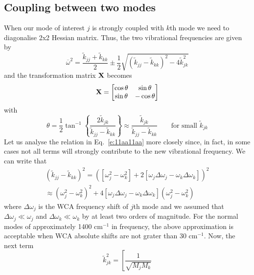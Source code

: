 \documentclass[a4paper,titlepage,twoside,fleqn,12pt]{book}
\begin{document}
\begin{refsection}
\subsection{Coupling between two modes\label{s:coupling-between-2-modes}}

When our mode of interest $j$ is strongly coupled
with $k$th mode we need to diagonalise 2x2 Hessian matrix.
Thus, the two vibrational frequencies are given by
%
\begin{equation} \label{e:11aa11aa}
 \overline{\omega}^2 = %
\frac{ \tilde{k}_{jj} + \tilde{k}_{kk} }{2}
\pm \frac{1}{2}
\sqrt{\left( \tilde{k}_{jj} - \tilde{k}_{kk}\right)^2 - 4\tilde{k}_{jk}^2}
\end{equation}
%
and the transformation matrix $\bf X$ becomes
%
\begin{equation} \label{e:ohoho}
 {\bf X} = 
\begin{bmatrix}
\cos{\theta} &   \sin{\theta}\\ 
\sin{\theta} &  -\cos{\theta}
\end{bmatrix}
\end{equation}
%
with
%
\begin{equation}
\theta = \frac{1}{2} \tan^{-1}\left\{\frac{2\tilde{k}_{jk}}{\tilde{k}_{jj} - \tilde{k}_{kk}}\right\} 
 \approx \frac{\tilde{k}_{jk}}{\tilde{k}_{jj} - \tilde{k}_{kk}} \qquad\text{for small $\tilde{k}_{jk}$}
\end{equation}
%
Let us analyse the relation in Eq.~\eqref{e:11aa11aa} more closely
since, in fact, in some cases not all terms will strongly contribute to the new vibrational
frequency. We can write that
%
\begin{multline}
 \left( \tilde{k}_{jj} - \tilde{k}_{kk}\right)^2 = 
 \left( \left[ \omega_j^2 - \omega_k^2 \right] 
 +
 2\left[ \omega_j\Delta\omega_j - \omega_k\Delta\omega_k \right]\right)^2 \\
 \approx \left( \omega_j^2 - \omega_k^2 \right)^2
 + 4 \left[ \omega_j\Delta\omega_j - \omega_k\Delta\omega_k \right] \left( \omega_j^2 - \omega_k^2 \right)
\end{multline}
%
where $\Delta\omega_j$ is the WCA frequency shift of $j$th mode
and we assumed that $\Delta\omega_j\ll\omega_j$ and $\Delta\omega_k\ll\omega_k$
by at least two orders of magnitude. For the
normal modes of approximately 1400 cm$^{-1}$
in frequency, the above approximation is acceptable
when WCA absolute shifts are not grater than 30 cm$^{-1}$.
Now, the next term
%
\begin{equation}
 \tilde{k}_{jk}^2 = \left[ \frac{1}{\sqrt{M_jM_k}}

\end{equation}
\end{refsection}
\end{document}
